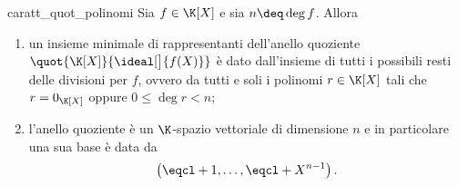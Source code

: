 \begin{theorem}{caratt_quot_polinomi}
    Sia $f \in \K[X]$ e sia $n \deq \deg f$. Allora \begin{enumerate}[label={(\roman*)}]
        \item un insieme minimale di rappresentanti dell'anello quoziente $\quot{\K[X]}{\ideal[\big]{f(X)}}$ è dato dall'insieme di tutti i possibili resti delle divisioni per $f$, ovvero da tutti e soli i polinomi $r \in \K[X]$ tali che $r = 0_{\K[X]}$ oppure $0 \leq \deg r < n$;
        \item l'anello quoziente è un $\K$-spazio vettoriale di dimensione $n$ e in particolare una sua base è data da \[
            \left( \eqcl+{1}, \dots, \eqcl+{X^{n-1}} \right).
        \]
    \end{enumerate}
\end{theorem}
